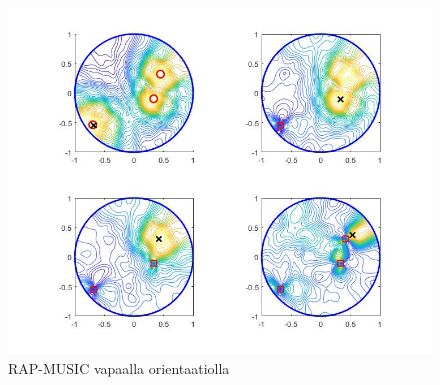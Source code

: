 \clearpage
\begin{figure}[ht]
    \centering
    \includegraphics[width=\textwidth]{RAPfree.jpg}
    \caption{RAP-MUSIC vapaalla orientaatiolla}
    \label{fig:RAPfree}
\end{figure}